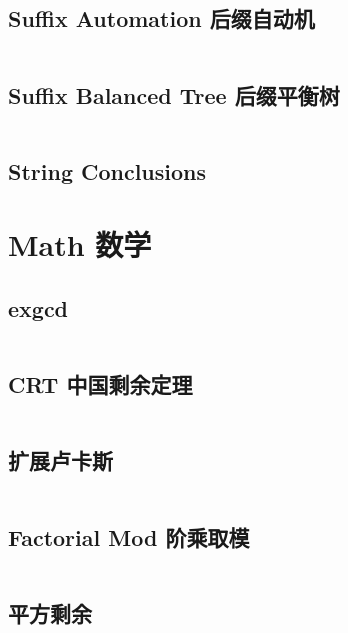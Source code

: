 \documentclass[titlepage, a4paper]{article}
\begin{document}
\begin{multicols}{2}
\begin{spacing}{0.6}
				\subsection{Suffix Automation 后缀自动机}
				\inputminted{cpp}{src/String/SAM.cpp}
				\subsection{Suffix Balanced Tree 后缀平衡树}
				\inputminted{cpp}{src/String/后缀平衡树.cpp}
				\subsection{String Conclusions}
				
			
			\section{Math 数学}
				\subsection{exgcd}
				\inputminted{cpp}{src/Math/exgcd.cpp}
				\subsection{CRT 中国剩余定理}
				\inputminted{cpp}{src/Math/CRT_lbn.cpp}
				\subsection{扩展卢卡斯}
				\inputminted{cpp}{src/Math/扩展卢卡斯.cpp}
				\subsection{Factorial Mod 阶乘取模}
				\inputminted{cpp}{src/Math/Factorial Mod.cpp}
				\subsection{平方剩余}
				\inputminted{cpp}{src/Math/平方剩余.cpp}

\end{spacing}
\end{multicols}
\end{document}
